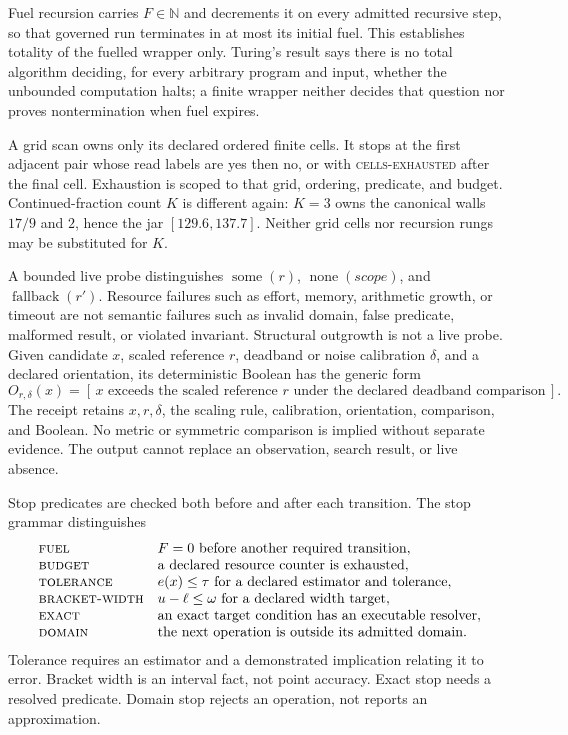 Fuel recursion carries \(F\in\mathbb N\) and decrements it on every admitted recursive step, so that governed run
terminates in at most its initial fuel.  This establishes totality of the fuelled wrapper only.  Turing's result says
there is no total algorithm deciding, for every arbitrary program and input, whether the unbounded computation halts;
a finite wrapper neither decides that question nor proves nontermination when fuel expires.

A grid scan owns only its declared ordered finite cells.  It stops at the first adjacent pair whose read labels are
yes then no, or with \textsc{cells-exhausted} after the final cell.  Exhaustion is scoped to that grid, ordering,
predicate, and budget.  Continued-fraction count \(K\) is different again: \(K=3\) owns the canonical walls \(17/9\)
and \(2\), hence the jar \([129.6,137.7]\).  Neither grid cells nor recursion rungs may be substituted for \(K\).

A bounded live probe distinguishes \(\operatorname{some}(r)\), \(\operatorname{none}(\textit{scope})\), and
\(\operatorname{fallback}(r')\).  Resource failures such as effort, memory, arithmetic growth, or timeout are not
semantic failures such as invalid domain, false predicate, malformed result, or violated invariant.  Structural
outgrowth is not a live probe.  Given candidate \(x\), scaled reference \(r\), deadband or noise calibration
\(\delta\), and a declared orientation, its deterministic Boolean has the generic form
\[
 O_{r,\delta}(x)=
 [\,x\text{ exceeds the scaled reference }r\text{ under the declared deadband comparison}\,].
\]
The receipt retains \(x,r,\delta\), the scaling rule, calibration, orientation, comparison, and Boolean.  No metric or
symmetric comparison is implied without separate evidence.  The output cannot replace an observation, search result,
or live absence.

Stop predicates are checked both before and after each transition.  The stop grammar distinguishes
\[
\begin{array}{ll}
\textsc{fuel}&F=0\text{ before another required transition},\\
\textsc{budget}&\text{a declared resource counter is exhausted},\\
\textsc{tolerance}&e(x)\leq\tau\text{ for a declared estimator and tolerance},\\
\textsc{bracket-width}&u-\ell\leq\omega\text{ for a declared width target},\\
\textsc{exact}&\text{an exact target condition has an executable resolver},\\
\textsc{domain}&\text{the next operation is outside its admitted domain}.
\end{array}
\]
Tolerance requires an estimator and a demonstrated implication relating it to error.  Bracket width is an interval fact, not point
accuracy.  Exact stop needs a resolved predicate.  Domain stop rejects an operation, not reports an approximation.

